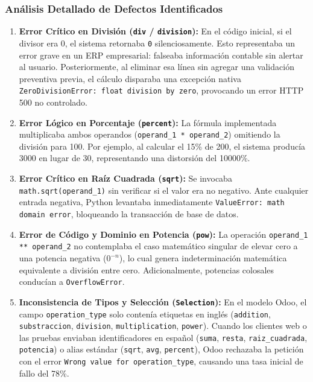 \documentclass{article}
\begin{document}
\subsubsection{Análisis Detallado de Defectos Identificados}
\begin{enumerate}
    \item \textbf{Error Crítico en División (\texttt{div} / \texttt{division}):} 
    En el código inicial, si el divisor era 0, el sistema retornaba \texttt{0} silenciosamente. Esto representaba un error grave en un ERP empresarial: falseaba información contable sin alertar al usuario. Posteriormente, al eliminar esa línea sin agregar una validación preventiva previa, el cálculo disparaba una excepción nativa \texttt{ZeroDivisionError: float division by zero}, provocando un error HTTP 500 no controlado.
    \item \textbf{Error Lógico en Porcentaje (\texttt{percent}):} 
    La fórmula implementada multiplicaba ambos operandos (\texttt{operand\_1 * operand\_2}) omitiendo la división para 100. Por ejemplo, al calcular el 15\% de 200, el sistema producía 3000 en lugar de 30, representando una distorsión del 10000\%.
    \item \textbf{Error Crítico en Raíz Cuadrada (\texttt{sqrt}):} 
    Se invocaba \texttt{math.sqrt(operand\_1)} sin verificar si el valor era no negativo. Ante cualquier entrada negativa, Python levantaba inmediatamente \texttt{ValueError: math domain error}, bloqueando la transacción de base de datos.
    \item \textbf{Error de Código y Dominio en Potencia (\texttt{pow}):} 
    La operación \texttt{operand\_1 ** operand\_2} no contemplaba el caso matemático singular de elevar cero a una potencia negativa ($0^{-n}$), lo cual genera indeterminación matemática equivalente a división entre cero. Adicionalmente, potencias colosales conducían a \texttt{OverflowError}.
    \item \textbf{Inconsistencia de Tipos y Selección (\texttt{Selection}):} 
    En el modelo Odoo, el campo \texttt{operation\_type} solo contenía etiquetas en inglés (\texttt{addition}, \texttt{substraccion}, \texttt{division}, \texttt{multiplication}, \texttt{power}). Cuando los clientes web o las pruebas enviaban identificadores en español (\texttt{suma}, \texttt{resta}, \texttt{raiz\_cuadrada}, \texttt{potencia}) o alias estándar (\texttt{sqrt}, \texttt{avg}, \texttt{percent}), Odoo rechazaba la petición con el error \texttt{Wrong value for operation\_type}, causando una tasa inicial de fallo del 78\%.
\end{enumerate}
\end{document}
